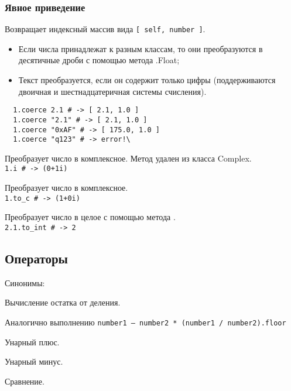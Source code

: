 \subsubsection{Явное приведение}

\begin{methodlist}
  Возвращает индексный массив вида \verb![ self, number ]!. 
  \begin{itemize}
    \item Если числа принадлежат к разным классам, то они преобразуются в десятичные дроби с помощью метода .Float;

    \item Текст преобразуется, если он содержит только цифры (поддерживаются двоичная и шестнадцатеричная системы счисления).
  \end{itemize}
  \begin{verbatim}
  1.coerce 2.1 # -> [ 2.1, 1.0 ]
  1.coerce "2.1" # -> [ 2.1, 1.0 ]
  1.coerce "0xAF" # -> [ 175.0, 1.0 ]
  1.coerce "q123" # -> error!\
  \end{verbatim}

  Преобразует число в комплексное. Метод удален из класса Complex.
  \\\verb!1.i # -> (0+1i)!

  Преобразует число в комплексное. 
  \\\verb!1.to_c # -> (1+0i)!

  Преобразует число в целое с помощью метода .
  \\\verb!2.1.to_int # -> 2!
\end{methodlist}

\subsection*{Операторы}

\begin{methodlist}
  Синонимы: 

  Вычисление остатка от деления.

  Аналогично выполнению \verb!number1 – number2 * (number1 / number2).floor!

  Унарный плюс.

  Унарный минус.

  Сравнение.
\end{methodlist}

